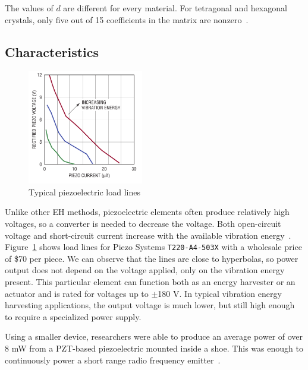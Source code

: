 \documentclass[a4paper,10pt]{article}
\begin{document}
The values of $d$ are different for every material. For tetragonal and hexagonal crystals, only five out of 15 coefficients in the matrix are nonzero~\cite{wiki:piezo}. 

\subsection{Characteristics}

\begin{figure}
\centering
  \includegraphics[width=0.45\textwidth]{./Slike/Piezo-UI}
\caption{Typical piezoelectric load lines~\cite{LT-Piezo}}
\label{fig:piezo-load}
\end{figure}

Unlike other \ac{EH} methods, piezoelectric elements often produce relatively high voltages, so a converter is needed to decrease the voltage. Both open-circuit voltage and short-circuit current increase with the available vibration energy~\cite{LT-Piezo}. Figure~\ref{fig:piezo-load} shows load lines for Piezo Systems \texttt{T220-A4-503X} with a wholesale price of \$70 per piece. We can observe that the lines are close to hyperbolas, so power output does not depend on the voltage applied, only on the vibration energy present. This particular element can function both as an energy harvester or an actuator and is rated for voltages up to $\pm$180 V. In typical vibration energy harvesting applications, the output voltage is much lower, but still high enough to require a specialized power supply. 

Using a smaller device, researchers were able to produce an average power of over 8 mW from a \ac{PZT}-based piezoelectric mounted inside a shoe. This was enough to continuously power a short range radio frequency emitter~\cite{piezo-shoe-ieee}. 

\end{document}

